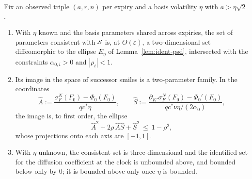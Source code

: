 \documentclass[../../../main.tex]{subfiles}
\begin{document}
\begin{proposition}\label{prop:ident-consistent}
Fix an observed triple $(a,r,n)$ per expiry and a basis volatility $\eta$ with $a>\eta\sqrt2$.
\begin{enumerate}[nosep,label=(\roman*)]
\item With $\eta$ known and the basis parameters shared across expiries, the set of parameters consistent with $\mathcal S$ is, at $O(\varepsilon)$, a two-dimensional set diffeomorphic to the ellipse $E_\eta$ of Lemma~\ref{lem:ident-psd}, intersected with the constraints $\alpha_{0,i}>0$ and $|\rho_i|<1$.
\item Its image in the space of successor smiles is a two-parameter family. In the coordinates
\[
\hat A:=\frac{\sigma^N_F(F_0)-\Phi_0(F_0)}{q c^*\eta},\qquad
\hat S:=\frac{\partial_{K'}\sigma^N_F(F_0)-\Phi_0'(F_0)}{qc^*\nu\eta/(2\alpha_0)},
\]
the image is, to first order, the ellipse
\begin{equation}\label{eq:ident-region}
\hat A^2+2\rho\,\hat A\hat S+\hat S^2\ \le\ 1-\rho^2 ,
\end{equation}
whose projections onto each axis are $[-1,1]$.
\item With $\eta$ unknown, the consistent set is three-dimensional and the identified set for the diffusion coefficient at the clock is unbounded above, and bounded below only by $0$; it is bounded above only once $\eta$ is bounded.
\end{enumerate}
\end{proposition}
\end{document}
